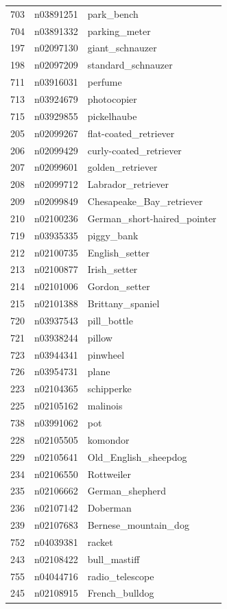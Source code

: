 \begin{table}
\begin{tabular}{cll}
703 & n03891251 & park_bench \\
704 & n03891332 & parking_meter \\
197 & n02097130 & giant_schnauzer \\
198 & n02097209 & standard_schnauzer \\
711 & n03916031 & perfume \\
713 & n03924679 & photocopier \\
715 & n03929855 & pickelhaube \\
205 & n02099267 & flat-coated_retriever \\
206 & n02099429 & curly-coated_retriever \\
207 & n02099601 & golden_retriever \\
208 & n02099712 & Labrador_retriever \\
209 & n02099849 & Chesapeake_Bay_retriever \\
210 & n02100236 & German_short-haired_pointer \\
719 & n03935335 & piggy_bank \\
212 & n02100735 & English_setter \\
213 & n02100877 & Irish_setter \\
214 & n02101006 & Gordon_setter \\
215 & n02101388 & Brittany_spaniel \\
720 & n03937543 & pill_bottle \\
721 & n03938244 & pillow \\
723 & n03944341 & pinwheel \\
726 & n03954731 & plane \\
223 & n02104365 & schipperke \\
225 & n02105162 & malinois \\
738 & n03991062 & pot \\
228 & n02105505 & komondor \\
229 & n02105641 & Old_English_sheepdog \\
234 & n02106550 & Rottweiler \\
235 & n02106662 & German_shepherd \\
236 & n02107142 & Doberman \\
239 & n02107683 & Bernese_mountain_dog \\
752 & n04039381 & racket \\
243 & n02108422 & bull_mastiff \\
755 & n04044716 & radio_telescope \\
245 & n02108915 & French_bulldog \\

\end{tabular}
\end{table}
